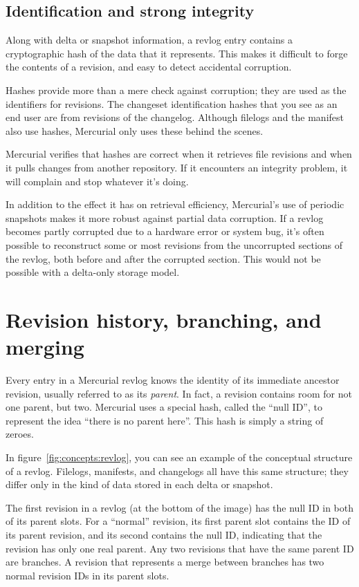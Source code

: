 \subsection{Identification and strong integrity}

Along with delta or snapshot information, a revlog entry contains a
cryptographic hash of the data that it represents.  This makes it
difficult to forge the contents of a revision, and easy to detect
accidental corruption.  

Hashes provide more than a mere check against corruption; they are
used as the identifiers for revisions.  The changeset identification
hashes that you see as an end user are from revisions of the
changelog.  Although filelogs and the manifest also use hashes,
Mercurial only uses these behind the scenes.

Mercurial verifies that hashes are correct when it retrieves file
revisions and when it pulls changes from another repository.  If it
encounters an integrity problem, it will complain and stop whatever
it's doing.

In addition to the effect it has on retrieval efficiency, Mercurial's
use of periodic snapshots makes it more robust against partial data
corruption.  If a revlog becomes partly corrupted due to a hardware
error or system bug, it's often possible to reconstruct some or most
revisions from the uncorrupted sections of the revlog, both before and
after the corrupted section.  This would not be possible with a
delta-only storage model.

\section{Revision history, branching, and merging}

Every entry in a Mercurial revlog knows the identity of its immediate
ancestor revision, usually referred to as its \emph{parent}.  In fact,
a revision contains room for not one parent, but two.  Mercurial uses
a special hash, called the ``null ID'', to represent the idea ``there
is no parent here''.  This hash is simply a string of zeroes.

In figure~\ref{fig:concepts:revlog}, you can see an example of the
conceptual structure of a revlog.  Filelogs, manifests, and changelogs
all have this same structure; they differ only in the kind of data
stored in each delta or snapshot.

The first revision in a revlog (at the bottom of the image) has the
null ID in both of its parent slots.  For a ``normal'' revision, its
first parent slot contains the ID of its parent revision, and its
second contains the null ID, indicating that the revision has only one
real parent.  Any two revisions that have the same parent ID are
branches.  A revision that represents a merge between branches has two
normal revision IDs in its parent slots.

